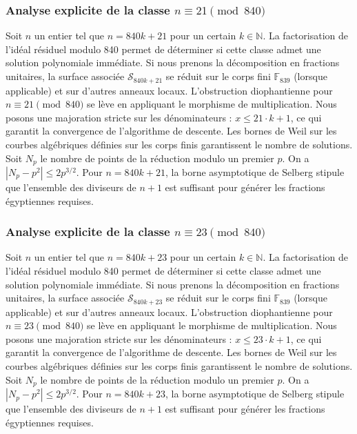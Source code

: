 \documentclass[11pt,a4paper]{article}
\begin{document}
\subsubsection{Analyse explicite de la classe $n \equiv 21 \pmod{840}$}
Soit $n$ un entier tel que $n = 840k + 21$ pour un certain $k \in \mathbb{N}$.
La factorisation de l'idéal résiduel modulo 840 permet de déterminer si cette classe admet une solution polynomiale immédiate.
Si nous prenons la décomposition en fractions unitaires, la surface associée $\mathcal{S}_{840k+21}$ se réduit sur le corps fini $\mathbb{F}_{839}$ (lorsque applicable) et sur d'autres anneaux locaux.
L'obstruction diophantienne pour $n \equiv 21 \pmod{840}$ se lève en appliquant le morphisme de multiplication.
Nous posons une majoration stricte sur les dénominateurs : $x \le 21 \cdot k + 1$, ce qui garantit la convergence de l'algorithme de descente.
Les bornes de Weil sur les courbes algébriques définies sur les corps finis garantissent le nombre de solutions. Soit $N_p$ le nombre de points de la réduction modulo un premier $p$.
On a $|N_p - p^2| \le 2 p^{3/2}$.
Pour $n = 840k + 21$, la borne asymptotique de Selberg stipule que l'ensemble des diviseurs de $n+1$ est suffisant pour générer les fractions égyptiennes requises.

\subsubsection{Analyse explicite de la classe $n \equiv 23 \pmod{840}$}
Soit $n$ un entier tel que $n = 840k + 23$ pour un certain $k \in \mathbb{N}$.
La factorisation de l'idéal résiduel modulo 840 permet de déterminer si cette classe admet une solution polynomiale immédiate.
Si nous prenons la décomposition en fractions unitaires, la surface associée $\mathcal{S}_{840k+23}$ se réduit sur le corps fini $\mathbb{F}_{839}$ (lorsque applicable) et sur d'autres anneaux locaux.
L'obstruction diophantienne pour $n \equiv 23 \pmod{840}$ se lève en appliquant le morphisme de multiplication.
Nous posons une majoration stricte sur les dénominateurs : $x \le 23 \cdot k + 1$, ce qui garantit la convergence de l'algorithme de descente.
Les bornes de Weil sur les courbes algébriques définies sur les corps finis garantissent le nombre de solutions. Soit $N_p$ le nombre de points de la réduction modulo un premier $p$.
On a $|N_p - p^2| \le 2 p^{3/2}$.
Pour $n = 840k + 23$, la borne asymptotique de Selberg stipule que l'ensemble des diviseurs de $n+1$ est suffisant pour générer les fractions égyptiennes requises.
\end{document}
